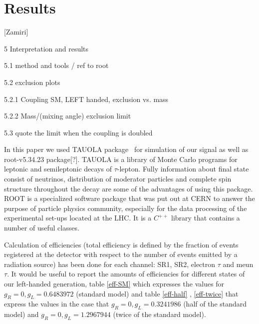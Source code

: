 \section{Results}\label{sec:results} 

[Zamiri]

5 Interpretation and results

5.1 method and tools / ref to root

5.2 exclusion plots

5.2.1 Coupling SM, LEFT handed, exclusion vs. mass

5.2.2 Mass/(mixing angle) exclusion limit

5.3 quote the limit when the coupling is doubled

In this paper we used TAUOLA package~\cite{Jadach:1990mz,Golonka:2003xt,Jadach:1993hs} for simulation of our signal as well as root-v5.34.23 package[?]. TAUOLA is a library of Monte Carlo programs for leptonic and semileptonic decays of $\tau$-lepton. Fully information about final state consist of neutrinos, distribution of moderator particles and complete spin structure throughout the decay are some of the advantages of using this package. ROOT is a specialized software package that was put out at CERN to answer the purpose of particle physics community, especially for the data processing of the experimental set-ups located at the LHC. It is a $C^{++}$ library that contains a number of useful classes.  

 Calculation of efficiencies (total efficiency is defined by the fraction of events registered at the detector with respect to the number of events emitted by a radiation source) has been done for each channel: SR1, SR2, electron $\tau$ and meun $\tau$. It would be useful to report the amounts of efficiencies for different states of our left-handed generation, table \ref{eff-SM}  which expresses the values for  $ g_R=0 , g_L=0.6483972 $ (standard model) and table \ref{eff-half} , \ref{eff-twice} that express the values in the case that  $ g_R=0 , g_L=0.3241986 $ (half of the standard model) and $ g_R=0 , g_L=1.2967944 $ (twice of the standard model).

